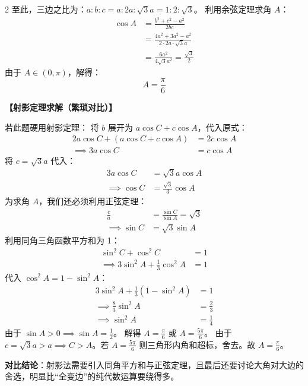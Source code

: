 \documentclass[11pt, a4paper]{ctexart}
\newcommand{\teachblock}[2]{%
  \par\addvspace{0.45em}%
  \noindent\textbf{【#1】}\par
  \begingroup
    \setlength{\parskip}{0.35em}%
    #2\par
  \endgroup
}
\begin{document}
\begin{paracol}{2}
{  至此，三边之比为：$a : b : c = a : 2a : \sqrt{3}a = 1 : 2 : \sqrt{3}$。
  利用余弦定理求角 $A$：
  \[
  \begin{aligned}
  \cos A &= \frac{b^2+c^2-a^2}{2bc} \\
  &= \frac{4a^2 + 3a^2 - a^2}{2 \cdot 2a \cdot \sqrt{3}a} \\
  &= \frac{6a^2}{4\sqrt{3}a^2} = \frac{\sqrt{3}}{2}
  \end{aligned}
  \]
  由于 $A \in (0, \pi)$，解得：
  \[
  \boxed{A = \frac{\pi}{6}}
  \]
}
\switchcolumn
\teachblock{射影定理求解（繁琐对比）}{
  若此题硬用射影定理：
  将 $b$ 展开为 $a\cos C + c\cos A$，代入原式：
  \[
  \begin{aligned}
  2a\cos C + (a\cos C + c\cos A) &= 2c\cos A \\
  \implies 3a\cos C &= c\cos A
  \end{aligned}
  \]
  将 $c = \sqrt{3}a$ 代入：
  \[
  \begin{aligned}
  3a\cos C &= \sqrt{3}a\cos A \\
  \implies \cos C &= \frac{\sqrt{3}}{3}\cos A
  \end{aligned}
  \]
  为求角 $A$，我们还必须利用正弦定理：
  \[
  \begin{aligned}
  \frac{c}{a} &= \frac{\sin C}{\sin A} = \sqrt{3} \\
  \implies \sin C &= \sqrt{3}\sin A
  \end{aligned}
  \]
  利用同角三角函数平方和为 1：
  \[
  \begin{aligned}
  \sin^2 C + \cos^2 C &= 1 \\
  \implies 3\sin^2 A + \frac{1}{3}\cos^2 A &= 1
  \end{aligned}
  \]
  代入 $\cos^2 A = 1 - \sin^2 A$：
  \[
  \begin{aligned}
  3\sin^2 A + \frac{1}{3}(1 - \sin^2 A) &= 1 \\
  \implies \frac{8}{3}\sin^2 A &= \frac{2}{3} \\
  \implies \sin^2 A &= \frac{1}{4}
  \end{aligned}
  \]
  由于 $\sin A > 0 \implies \sin A = \frac{1}{2}$。
  解得 $A = \frac{\pi}{6}$ 或 $A = \frac{5\pi}{6}$。
  由于 $c = \sqrt{3}a > a \implies C > A$。若 $A = \frac{5\pi}{6}$ 则三角形内角和超标，舍去。故 $A = \frac{\pi}{6}$。
  
  \textbf{对比结论}：射影法需要引入同角平方和与正弦定理，且最后还要讨论大角对大边的舍选，明显比“全变边”的纯代数运算要绕得多。
}
\end{paracol}

\newpage
\end{document}
